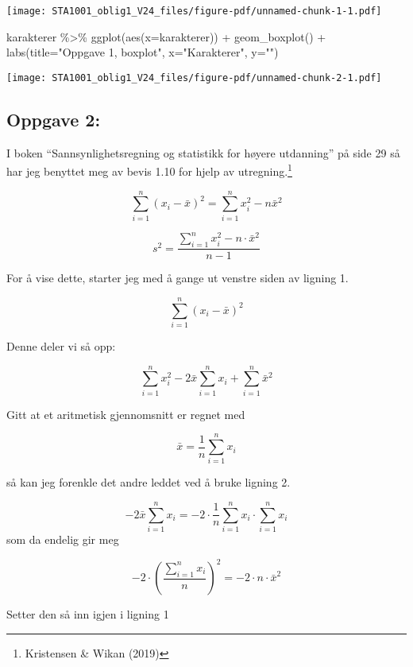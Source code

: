 \documentclass[
  12pt,
  a4paper,
  DIV=11,
  numbers=noendperiod]{scrartcl}
\newenvironment{Shaded}{\begin{snugshade}}{\end{snugshade}}
\newcommand{\AttributeTok}[1]{\textcolor[rgb]{0.40,0.45,0.13}{#1}}
\newcommand{\FunctionTok}[1]{\textcolor[rgb]{0.28,0.35,0.67}{#1}}
\newcommand{\NormalTok}[1]{\textcolor[rgb]{0.00,0.23,0.31}{#1}}
\newcommand{\SpecialCharTok}[1]{\textcolor[rgb]{0.37,0.37,0.37}{#1}}
\newcommand{\StringTok}[1]{\textcolor[rgb]{0.13,0.47,0.30}{#1}}
\begin{document}
\texttt{[image: STA1001\_oblig1\_V24\_files/figure-pdf/unnamed-chunk-1-1.pdf]}

\begin{Shaded}
\begin{Highlighting}[]
\NormalTok{karakterer }\SpecialCharTok{\%\textgreater{}\%} 
  \FunctionTok{ggplot}\NormalTok{(}\FunctionTok{aes}\NormalTok{(}\AttributeTok{x=}\NormalTok{karakterer)) }\SpecialCharTok{+}
  \FunctionTok{geom\_boxplot}\NormalTok{() }\SpecialCharTok{+}
  \FunctionTok{labs}\NormalTok{(}\AttributeTok{title=}\StringTok{"Oppgave 1, boxplot"}\NormalTok{, }\AttributeTok{x=}\StringTok{"Karakterer"}\NormalTok{, }\AttributeTok{y=}\StringTok{""}\NormalTok{)}
\end{Highlighting}
\end{Shaded}

\texttt{[image: STA1001\_oblig1\_V24\_files/figure-pdf/unnamed-chunk-2-1.pdf]}

\subsection{Oppgave 2:}\label{oppgave-2}

I boken ``Sannsynlighetsregning og statistikk for høyere utdanning'' på
side 29 så har jeg benyttet meg av bevis 1.10 for hjelp av
utregning.\footnote{Kristensen \& Wikan (2019)}

\[
\sum_{i=1}^{n} (x_i - \bar{x})^2 = \sum_{i=1}^{n} x_i^2 - n\bar{x}^2 \tag{1}
\]

\[s^2 = \frac{\sum_{i=1}^{n} x_i^2 - n \cdot \bar x^2}{n-1}\]

For å vise dette, starter jeg med å gange ut venstre siden av ligning 1.

\[\sum_{i=1}^{n} (x_i - \bar x)^2\]

Denne deler vi så opp:

\[\sum_{i=1}^{n} x_i^2 - 2\bar x\sum_{i=1}^{n} x_i + \sum_{i=1}^{n} \bar x^2\]

Gitt at et aritmetisk gjennomsnitt er regnet med

\[\bar{x} = \frac{1}{n}\sum_{i=1}^{n} x_i \tag{2}\]

så kan jeg forenkle det andre leddet ved å bruke ligning 2.

\[- 2\bar x \sum_{i=1}^{n} x_i = -2 \cdot \frac{1}{n}\sum_{i=1}^{n} x_i \cdot \sum_{i=1}^{n} x_i\]
som da endelig gir meg

\[-2 \cdot \left(\frac{\sum_{i=1}^{n} x_i}{n}\right)^2 = -2 \cdot n \cdot \bar x^2\]

Setter den så inn igjen i ligning 1
\end{document}
